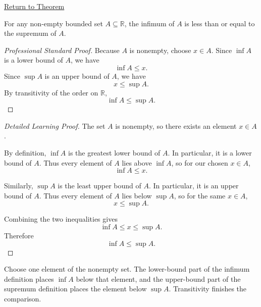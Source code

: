 \newpage
{}
\label{prf:infimum-less-than-supremum}

\begin{remark*}[Return]
\hyperref[thm:infimum-less-than-supremum]{Return to Theorem}
\end{remark*}


\begin{theorem*}
For any non-empty bounded set $A \subseteq \mathbb{R}$, the infimum of $A$ is less than or equal to the supremum of $A$.
\end{theorem*}

\begin{proof}[Professional Standard Proof]
\LRAProofBodyStart
Because \(A\) is nonempty, choose \(x\in A\). Since \(\inf A\) is a lower
bound of \(A\), we have
\[
\inf A\le x.
\]
Since \(\sup A\) is an upper bound of \(A\), we have
\[
x\le \sup A.
\]
By transitivity of the order on \(\mathbb{R}\),
\[
\inf A\le \sup A.
\]
\end{proof}

\begin{proof}[Detailed Learning Proof]
\LRAProofBodyStart
The set \(A\) is nonempty, so there exists an element \(x\in A\).

By definition, \(\inf A\) is the greatest lower bound of \(A\). In
particular, it is a lower bound of \(A\). Thus every element of \(A\) lies
above \(\inf A\), so for our chosen \(x\in A\),
\[
\inf A\le x.
\]

Similarly, \(\sup A\) is the least upper bound of \(A\). In particular, it is
an upper bound of \(A\). Thus every element of \(A\) lies below \(\sup A\), so
for the same \(x\in A\),
\[
x\le \sup A.
\]

Combining the two inequalities gives
\[
\inf A\le x\le \sup A.
\]
Therefore
\[
\inf A\le \sup A.
\]
\end{proof}

\begin{remark*}
Choose one element of the nonempty set. The lower-bound part of the infimum
definition places \(\inf A\) below that element, and the upper-bound part of
the supremum definition places the element below \(\sup A\). Transitivity
finishes the comparison.
\end{remark*}

